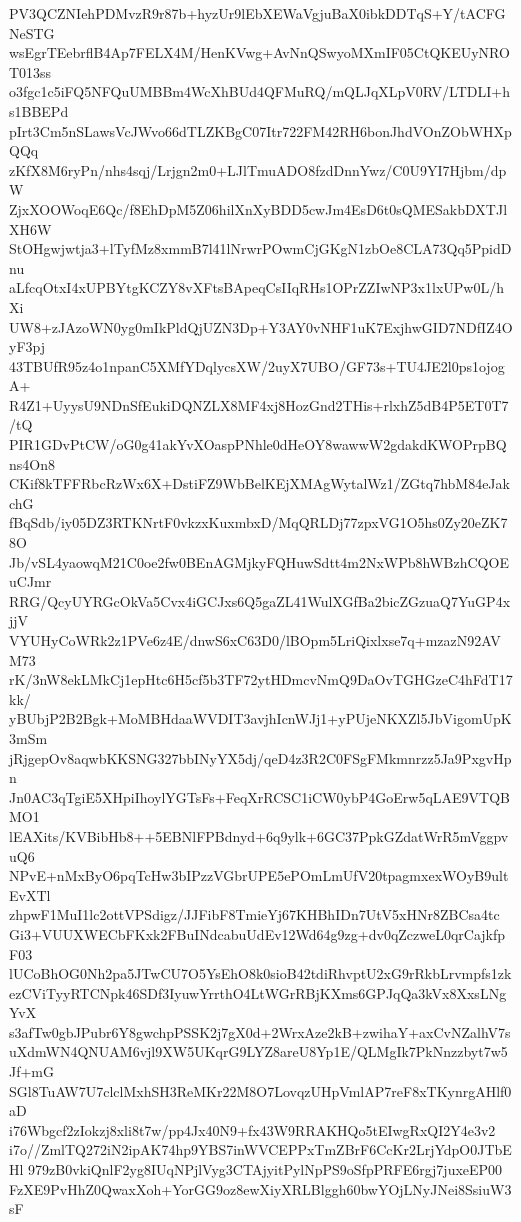 PV3QCZNIehPDMvzR9r87b+hyzUr9lEbXEWaVgjuBaX0ibkDDTqS+Y/tACFGNeSTG
wsEgrTEebrflB4Ap7FELX4M/HenKVwg+AvNnQSwyoMXmIF05CtQKEUyNROT013ss
o3fgc1c5iFQ5NFQuUMBBm4WcXhBUd4QFMuRQ/mQLJqXLpV0RV/LTDLI+hs1BBEPd
pIrt3Cm5nSLawsVcJWvo66dTLZKBgC07Itr722FM42RH6bonJhdVOnZObWHXpQQq
zKfX8M6ryPn/nhs4sqj/Lrjgn2m0+LJlTmuADO8fzdDnnYwz/C0U9YI7Hjbm/dpW
ZjxXOOWoqE6Qc/f8EhDpM5Z06hilXnXyBDD5cwJm4EsD6t0sQMESakbDXTJlXH6W
StOHgwjwtja3+lTyfMz8xmmB7l41lNrwrPOwmCjGKgN1zbOe8CLA73Qq5PpidDnu
aLfcqOtxI4xUPBYtgKCZY8vXFtsBApeqCsIIqRHs1OPrZZIwNP3x1lxUPw0L/hXi
UW8+zJAzoWN0yg0mIkPldQjUZN3Dp+Y3AY0vNHF1uK7ExjhwGID7NDfIZ4OyF3pj
43TBUfR95z4o1npanC5XMfYDqlycsXW/2uyX7UBO/GF73s+TU4JE2l0ps1ojogA+
R4Z1+UyysU9NDnSfEukiDQNZLX8MF4xj8HozGnd2THis+rlxhZ5dB4P5ET0T7/tQ
PIR1GDvPtCW/oG0g41akYvXOaspPNhle0dHeOY8wawwW2gdakdKWOPrpBQns4On8
CKif8kTFFRbcRzWx6X+DstiFZ9WbBelKEjXMAgWytalWz1/ZGtq7hbM84eJakchG
fBqSdb/iy05DZ3RTKNrtF0vkzxKuxmbxD/MqQRLDj77zpxVG1O5hs0Zy20eZK78O
Jb/vSL4yaowqM21C0oe2fw0BEnAGMjkyFQHuwSdtt4m2NxWPb8hWBzhCQOEuCJmr
RRG/QcyUYRGcOkVa5Cvx4iGCJxs6Q5gaZL41WulXGfBa2bicZGzuaQ7YuGP4xjjV
VYUHyCoWRk2z1PVe6z4E/dnwS6xC63D0/lBOpm5LriQixlxse7q+mzazN92AVM73
rK/3nW8ekLMkCj1epHtc6H5cf5b3TF72ytHDmcvNmQ9DaOvTGHGzeC4hFdT17kk/
yBUbjP2B2Bgk+MoMBHdaaWVDIT3avjhIcnWJj1+yPUjeNKXZl5JbVigomUpK3mSm
jRjgepOv8aqwbKKSNG327bbINyYX5dj/qeD4z3R2C0FSgFMkmnrzz5Ja9PxgvHpn
Jn0AC3qTgiE5XHpiIhoylYGTsFs+FeqXrRCSC1iCW0ybP4GoErw5qLAE9VTQBMO1
lEAXits/KVBibHb8++5EBNlFPBdnyd+6q9ylk+6GC37PpkGZdatWrR5mVggpvuQ6
NPvE+nMxByO6pqTcHw3bIPzzVGbrUPE5ePOmLmUfV20tpagmxexWOyB9ultEvXTl
zhpwF1MuI1lc2ottVPSdigz/JJFibF8TmieYj67KHBhIDn7UtV5xHNr8ZBCsa4tc
Gi3+VUUXWECbFKxk2FBuINdcabuUdEv12Wd64g9zg+dv0qZczweL0qrCajkfpF03
lUCoBhOG0Nh2pa5JTwCU7O5YsEhO8k0sioB42tdiRhvptU2xG9rRkbLrvmpfs1zk
ezCViTyyRTCNpk46SDf3IyuwYrrthO4LtWGrRBjKXms6GPJqQa3kVx8XxsLNgYvX
s3afTw0gbJPubr6Y8gwchpPSSK2j7gX0d+2WrxAze2kB+zwihaY+axCvNZalhV7s
uXdmWN4QNUAM6vjl9XW5UKqrG9LYZ8areU8Yp1E/QLMgIk7PkNnzzbyt7w5Jf+mG
SGl8TuAW7U7clclMxhSH3ReMKr22M8O7LovqzUHpVmlAP7reF8xTKynrgAHlf0aD
i76Wbgcf2zIokzj8xli8t7w/pp4Jx40N9+fx43W9RRAKHQo5tEIwgRxQI2Y4e3v2
i7o//ZmlTQ272iN2ipAK74hp9YBS7inWVCEPPxTmZBrF6CcKr2LrjYdpO0JTbEHl
979zB0vkiQnlF2yg8IUqNPjlVyg3CTAjyitPylNpPS9oSfpPRFE6rgj7juxeEP00
FzXE9PvHhZ0QwaxXoh+YorGG9oz8ewXiyXRLBlggh60bwYOjLNyJNei8SsiuW3sF
